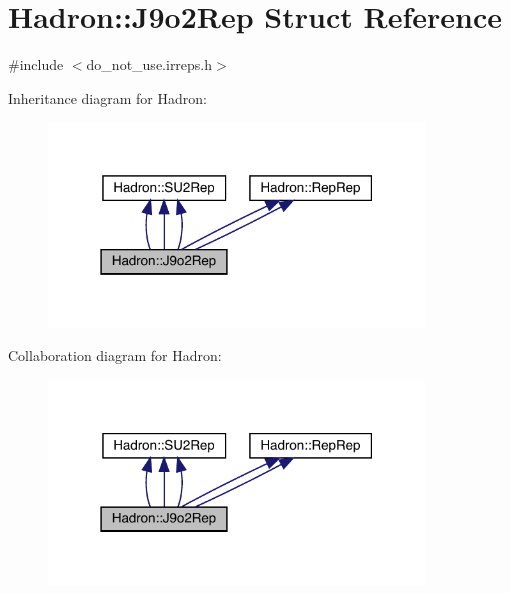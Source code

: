 \hypertarget{structHadron_1_1J9o2Rep}{}\section{Hadron\+:\+:J9o2\+Rep Struct Reference}
\label{structHadron_1_1J9o2Rep}


{\ttfamily \#include $<$do\+\_\+not\+\_\+use.\+irreps.\+h$>$}



Inheritance diagram for Hadron\+:
\nopagebreak
\begin{figure}[H]
\begin{center}
\leavevmode
\includegraphics[width=283pt]{dd/d8d/structHadron_1_1J9o2Rep__inherit__graph}
\end{center}
\end{figure}


Collaboration diagram for Hadron\+:
\nopagebreak
\begin{figure}[H]
\begin{center}
\leavevmode
\includegraphics[width=283pt]{d7/d40/structHadron_1_1J9o2Rep__coll__graph}
\end{center}
\end{figure}
